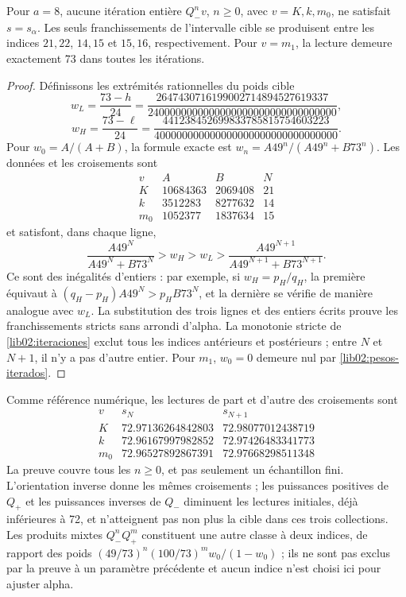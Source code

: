 \begin{proposition}
\label{lib02:cruces-enteros}
Pour \(a=8\), aucune itération entière \(Q_-^nv\), \(n\geq0\),
avec \(v=K,k,m_0\), ne satisfait \(s=s_\alpha\). Les seuls franchissements
de l’intervalle cible se produisent entre les indices \(21,22\),
\(14,15\) et \(15,16\), respectivement. Pour \(v=m_1\), la
lecture demeure exactement 73 dans toutes les itérations.
\end{proposition}
\begin{proof}
Définissons les extrémités rationnelles du poids cible
\[
 w_L=\frac{73-h}{24}
 =\frac{2647430716199002714894527619337}
 {2400000000000000000000000000000000},
\]
\[
 w_H=\frac{73-\ell}{24}
 =\frac{441238452699833785815754603223}
 {400000000000000000000000000000000}.
\]
Pour \(w_0=A/(A+B)\), la formule exacte est
\(w_n=A49^n/(A49^n+B73^n)\). Les données et les croisements sont
\[
\begin{array}{c|r|r|c}
 v&A&B&N\\\hline
 K&10684363&2069408&21\\
 k&3512283&8277632&14\\
 m_0&1052377&1837634&15
\end{array}
\]
et satisfont, dans chaque ligne,
\[
 \frac{A49^N}{A49^N+B73^N}>w_H>w_L>
 \frac{A49^{N+1}}{A49^{N+1}+B73^{N+1}}.
\]
Ce sont des inégalités d’entiers : par exemple, si
\(w_H=p_H/q_H\), la première équivaut à
\((q_H-p_H)A49^N>p_HB73^N\), et la dernière se vérifie
de manière analogue avec \(w_L\). La substitution des trois lignes et des
entiers écrits prouve les franchissements stricts sans arrondi
d’alpha. La monotonie stricte de \cref{lib02:iteraciones} exclut
tous les indices antérieurs et postérieurs ; entre \(N\) et
\(N+1\), il n’y a pas d’autre entier. Pour \(m_1\), \(w_0=0\) demeure
nul par \eqref{lib02:pesos-iterados}.
\end{proof}

Comme référence numérique, les lectures de part et d’autre des croisements sont
\[
\begin{array}{c|c|c}
 v&s_N&s_{N+1}\\\hline
 K&72.97136264842803&72.98077012438719\\
 k&72.96167997982852&72.97426483341773\\
 m_0&72.96527892867391&72.97668298511348
\end{array}
\]
La preuve couvre tous les \(n\geq0\), et pas seulement un échantillon fini.
L’orientation inverse donne les mêmes croisements ; les puissances positives de
\(Q_+\) et les puissances inverses de \(Q_-\) diminuent les
lectures initiales, déjà inférieures à 72, et n’atteignent pas non plus la cible
dans ces trois collections. Les produits mixtes \(Q_-^nQ_+^m\)
constituent une autre classe à deux indices, de rapport des poids
\((49/73)^n(100/73)^m w_0/(1-w_0)\) ; ils ne sont pas exclus par
la preuve à un paramètre précédente et aucun indice n’est choisi ici pour ajuster
alpha.

